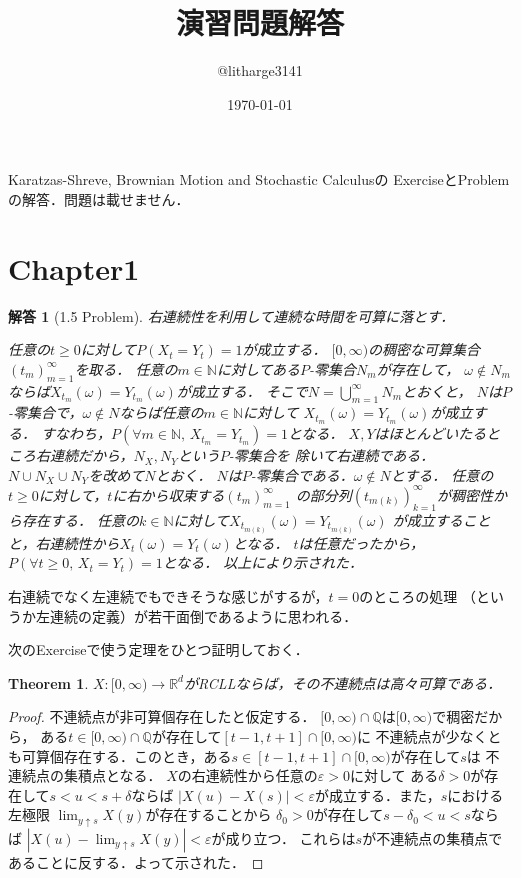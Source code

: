 \documentclass[dvipdfmx,autodetect-engine]{jsarticle}
\newtheorem{theorem}{Theorem}[section]
\newtheorem*{ans}{解答}
\theoremstyle{remark}
\theoremstyle{definition}
\newcommand{\R}{\mathbb{R}}
\newcommand{\N}{\mathbb{N}}
\newcommand{\abs}[1]{\left\lvert#1\right\rvert}
\begin{document}
\title{演習問題解答}
\author{@litharge3141}
\date{\today}
\maketitle

\abstract
Karatzas-Shreve, Brownian Motion and Stochastic Calculusの
ExerciseとProblemの解答．問題は載せません．

\section{Chapter1}
\begin{ans}[1.5 Problem]
    右連続性を利用して連続な時間を可算に落とす．

    任意の$t \geq 0$に対して$P(X_{t}=Y_{t})=1$が成立する．
    $[0,\infty)$の稠密な可算集合$(t_{m})_{m=1}^{\infty}$を取る．
    任意の$m \in \N$に対してある$P$-零集合$N_{m}$が存在して，
    $\omega \notin N_{m}$ならば$X_{t_{m}}(\omega) = Y_{t_{m}}(\omega)$が成立する．
    そこで$N = \bigcup_{m=1}^{\infty} N_{m}$とおくと，
    $N$は$P$-零集合で，$\omega \notin N$ならば任意の$m\in \N$に対して
    $X_{t_{m}}(\omega) = Y_{t_{m}}(\omega)$が成立する．
    すなわち，$P(\forall m\in \N,\, X_{t_{m}} = Y_{t_{m}})=1$となる．
    $X,Y$はほとんどいたるところ右連続だから，$N_{X},N_{Y}$という$P$-零集合を
    除いて右連続である．$N \cup N_{X} \cup N_{Y}$を改めて$N$とおく．
    $N$は$P$-零集合である．$\omega \notin N$とする．
    任意の$t \geq 0$に対して，$t$に右から収束する$(t_{m})_{m=1}^{\infty}$
    の部分列$(t_{m(k)})_{k=1}^{\infty}$が稠密性から存在する．
    任意の$k\in \N$に対して$X_{t_{m(k)}}(\omega) = Y_{t_{m(k)}}(\omega)$
    が成立することと，右連続性から$X_{t}(\omega) = Y_{t}(\omega)$となる．
    $t$は任意だったから，$P(\forall t\geq 0,\, X_{t}=Y_{t})=1$となる．
    以上により示された．
\end{ans}
右連続でなく左連続でもできそうな感じがするが，$t=0$のところの処理
（というか左連続の定義）が若干面倒であるように思われる．

次のExerciseで使う定理をひとつ証明しておく．
\begin{theorem}
    $X:[0,\infty) \to \R^{d}$がRCLLならば，その不連続点は高々可算である．
\end{theorem}

\begin{proof}
    不連続点が非可算個存在したと仮定する．
    $[0,\infty)\cap \mathbb{Q}$は$[0,\infty)$で稠密だから，
    ある$t \in [0,\infty)\cap \mathbb{Q}$が存在して$[t-1,t+1]\cap[0,\infty)$に
    不連続点が少なくとも可算個存在する．このとき，ある$s \in
    [t-1,t+1]\cap[0,\infty)$が存在して$s$は
    不連続点の集積点となる．
    $X$の右連続性から任意の$\varepsilon>0$に対して
    ある$\delta > 0$が存在して$s<u<s+\delta$ならば
    $\abs{X(u) - X(s)} < \varepsilon$が成立する．また，$s$における左極限
    $\lim_{y \uparrow s} X(y)$が存在することから
    $\delta_{0} >0$が存在して$s - \delta_{0} < u < s$ならば
    $\abs{X(u) - \lim_{y \uparrow s} X(y)} <\varepsilon$が成り立つ．
    これらは$s$が不連続点の集積点であることに反する．よって示された．
\end{proof}
\end{document}

